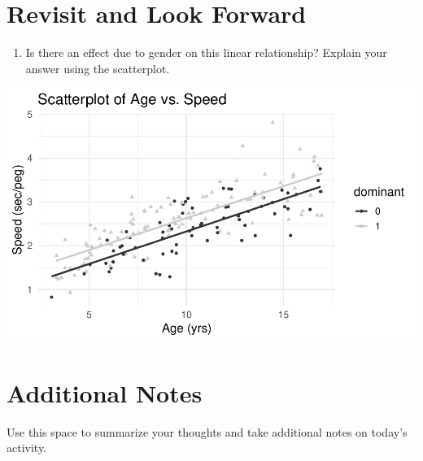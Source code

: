 \documentclass[
]{report}
\providecommand{\tightlist}{%
  \setlength{\itemsep}{0pt}\setlength{\parskip}{0pt}}
\begin{document}
\hypertarget{revisit-and-look-forward}{%
\section{Revisit and Look Forward}\label{revisit-and-look-forward}}

\begin{enumerate}
\def\labelenumi{\arabic{enumi}.}
\setcounter{enumi}{22}
\tightlist
\item
  Is there an effect due to gender on this linear relationship? Explain your answer using the scatterplot.
\end{enumerate}

\begin{center}\includegraphics[width=0.7\linewidth]{10-regression_files/figure-latex/unnamed-chunk-6-1} \end{center}

\hypertarget{additional-notes}{%
\section{Additional Notes}\label{additional-notes}}

Use this space to summarize your thoughts and take additional notes on today's activity.
\end{document}
